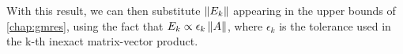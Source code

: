 
With this result, we can then substitute $\left\lVert E_{k}\right\rVert$ appearing in the upper bounds of \autoref{chap:gmres}, using the fact that $E_{k}\propto \epsilon_{k} \left\lVert A\right\rVert$, where $\epsilon_{k}$ is the tolerance used in the k-th inexact matrix-vector product.



